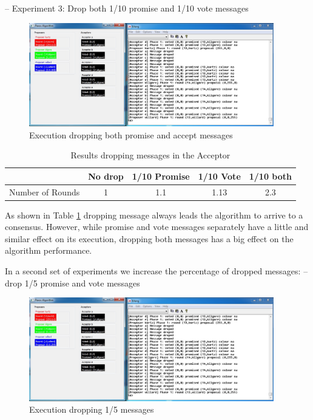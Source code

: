 – Experiment 3: Drop both 1/10 promise and 1/10 vote messages\newline
\begin{figure}[h!]
  \centering
    \includegraphics[width=0.95\textwidth]{./3_Experiments/images/drop_all.jpg}
    \caption{Execution dropping both promise and accept messages \label{fig:drop_all}}
\end{figure}

\begin{table}[h!]
  \centering
  \begin{tabular}{ |c | c | c | c | c |}
    \hline
                     & No drop & 1/10 Promise & 1/10 Vote & 1/10 both \\ \hline
    Number of Rounds & 1 & 1.1 & 1.13 & 2.3  \\ \hline
  \end{tabular}
  \caption{Results dropping messages in the Acceptor}
  \label{table:5}
\end{table}
As shown in Table \ref{table:5} dropping message always leads the algorithm to arrive to a consensus.
However, while promise and vote messages separately have a little and similar
effect on its execution, dropping both messages has a big effect on the algorithm
performance.

In a second set of experiments we increase the percentage of dropped messages:\newline
– drop 1/5 promise and vote messages
\begin{figure}[h!]
  \centering
    \includegraphics[width=0.95\textwidth]{./3_Experiments/images/drop_all.jpg}
    \caption{Execution dropping 1/5 messages \label{fig:drop_1}}
\end{figure}

